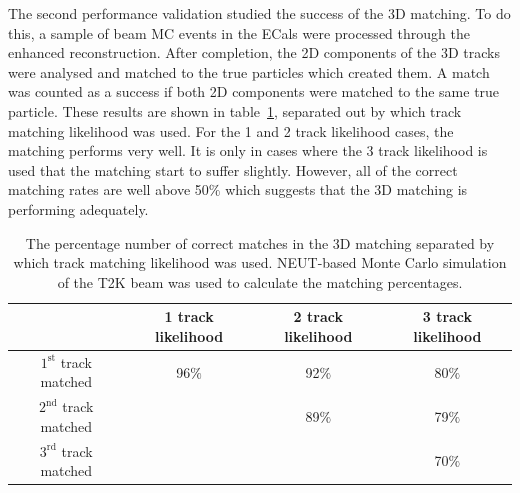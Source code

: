 \newline
The second performance validation studied the success of the 3D matching.  To do this, a sample of beam MC events in the ECals were processed through the enhanced reconstruction.  After completion, the 2D components of the 3D tracks were analysed and matched to the true particles which created them.  A match was counted as a success if both 2D components were matched to the same true particle.  These results are shown in table~\ref{table:PercentageCorrect3DMatching}, separated out by which track matching likelihood was used.  For the 1 and 2 track likelihood cases, the matching performs very well.  It is only in cases where the 3 track likelihood is used that the matching start to suffer slightly.  However, all of the correct matching rates are well above 50$\%$ which suggests that the 3D matching is performing adequately. 
\begin{table}
  \begin{tabular}{c | c c c }
   & 1 track likelihood & 2 track likelihood & 3 track likelihood \\ \hline \hline
   $1^{\textrm{st}}$ track matched& 96$\%$ & 92$\%$ & 80$\%$ \\
   $2^{\textrm{nd}}$ track matched&  & 89$\%$ & 79$\%$ \\
   $3^{\textrm{rd}}$ track matched&  &  & 70$\%$ \\
  \end{tabular}
  \caption{The percentage number of correct matches in the 3D matching separated by which track matching likelihood was used.  NEUT-based Monte Carlo simulation of the T2K beam was used to calculate the matching percentages.}
  \label{table:PercentageCorrect3DMatching}
\end{table}

